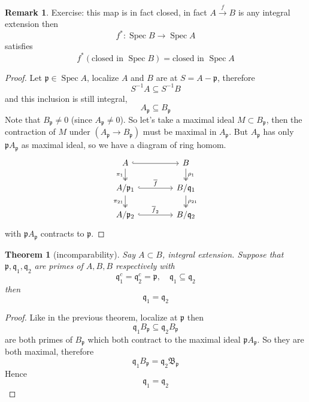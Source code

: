 \documentclass[11pt,a4paper]{article}
\theoremstyle{definition}
\newtheorem{remark}[definition]{Remark}
\theoremstyle{plain}
\newtheorem{theorem}[definition]{Theorem}
\theoremstyle{remark}
\newcommand{\Spec}{\operatorname{Spec}}
\begin{document}
\begin{remark}
    Exercise: this map is in fact closed, in fact $A \xrightarrow{f} B$ is any integral extension then 
    $$f^* \colon \Spec B \to \Spec A$$
    satisfies 
    $$f^*(\text{closed in } \Spec B) = \text{closed in } \Spec A$$
\end{remark}

\begin{proof}
    Let $\mathfrak{p} \in \Spec A$, localize $A$ and $B$ are at $S = A - \mathfrak{p}$, therefore 
    $$S^{-1} A \subseteq S^{-1}B$$
    and this inclusion is still integral, 
    $$A_\mathfrak{p} \subseteq B_\mathfrak{p}$$
    Note that $B_\mathfrak{p} \ne 0$ (since $A_\mathfrak{p} \ne 0$). So let's take a maximal ideal 
    $M \subset B_\mathfrak{p}$, then the contraction of $M$ under $(A_\mathfrak{p} \to B_\mathfrak{p})$ must be maximal in $A_\mathfrak{p}$. 
    But $A_\mathfrak{p}$ has only $\mathfrak{p}A_\mathfrak{p}$ as maximal ideal, so we have a diagram of ring homom. 
    \[
    \begin{tikzcd}[row sep=1.5em, column sep=4.2em]
    A \arrow[r,hook] \arrow[d,two heads,"{\pi_1}"'] & B \arrow[d,two heads,"{\rho_1}"] \\
    A/\mathfrak p_1 \arrow[r,hook,"\overline f"] \arrow[d,two heads,"{\pi_{21}}"'] &
    B/\mathfrak q_1 \arrow[d,two heads,"{\rho_{21}}"] \\
    A/\mathfrak p_2 \arrow[r,hook,"\overline f_2"] & B/\mathfrak q_2
    \end{tikzcd}
    \]
    with $\mathfrak{p}A_\mathfrak{p}$ contracts to $\mathfrak{p}$.
\end{proof}

\begin{theorem}[incomparability]
    Say $A \subset B$, integral extension. Suppose that $\mathfrak{p}, \mathfrak{q}_1, \mathfrak{q}_2$ are primes of $A,B,B$ respectively with 
    $$\mathfrak{q}_1^c = \mathfrak{q}_2^c = \mathfrak{p}, \quad \mathfrak{q}_1 \subseteq \mathfrak{q}_2$$
    then 
    $$\mathfrak{q}_1 = \mathfrak{q}_2$$ 
\end{theorem}

\begin{proof}
    Like in the previous theorem, localize at $\mathfrak{p}$ then 
    $$\mathfrak{q}_1 B_\mathfrak{p} \subseteq \mathfrak{q}_2 B_\mathfrak{p}$$
    are both primes of $B_\mathfrak{p}$ which both contract to the maximal ideal $\mathfrak{p} A_\mathfrak{p}$. So they 
    are both maximal, therefore 
    $$\mathfrak{q}_1 B_\mathfrak{p} = \mathfrak{q}_2 \mathfrak{B}_\mathfrak{p}$$
    Hence 
    $$\mathfrak{q}_1 = \mathfrak{q}_2$$
\end{proof}
\end{document}
